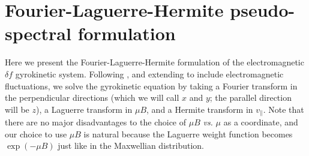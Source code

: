 \documentclass{jpp}
\begin{document}
\section{Fourier-Laguerre-Hermite pseudo-spectral formulation} \label{sec:lh}

Here we present the Fourier-Laguerre-Hermite formulation of the electromagnetic $\delta\!f$ gyrokinetic system. Following \cite{Mandell2018}, and extending to include electromagnetic fluctuations, we solve the gyrokinetic equation by taking a Fourier transform in the perpendicular directions (which we will call $x$ and $y$; the parallel direction will be $z$), a Laguerre transform in $\mu B$, and a Hermite transform in $v_\parallel$. Note that there are no major disadvantages to the choice of $\mu B$ {\it vs.} $\mu$ as a coordinate, and {\color{black} our choice to use $\mu B$ is natural because the Laguerre weight function becomes $\exp(-\mu B)$ just like in the Maxwellian distribution}.
\end{document}
